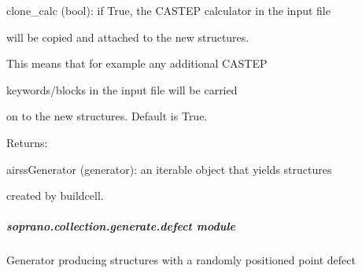 \documentclass[letterpaper,10pt,english]{sphinxmanual}
\begin{document}
\begin{fulllineitems}
\begin{DUlineblock}{0em}
\begin{DUlineblock}{\DUlineblockindent}
\item[] clone\_calc (bool): if True, the CASTEP calculator in the input file
\item[]
\begin{DUlineblock}{\DUlineblockindent}
\item[] will be copied and attached to the new structures.
\item[] This means that for example any additional CASTEP
\item[] keywords/blocks in the input file will be carried
\item[] on to the new structures. Default is True.
\end{DUlineblock}
\end{DUlineblock}
\end{DUlineblock}

\begin{DUlineblock}{0em}
\item[] Returns:
\item[]
\begin{DUlineblock}{\DUlineblockindent}
\item[] airssGenerator (generator): an iterable object that yields structures
\item[]
\begin{DUlineblock}{\DUlineblockindent}
\item[] created by buildcell.
\end{DUlineblock}
\end{DUlineblock}
\end{DUlineblock}

\end{fulllineitems}



\subparagraph{soprano.collection.generate.defect module}
\label{doctree/soprano.collection.generate.defect:module-soprano.collection.generate.defect}\label{doctree/soprano.collection.generate.defect::doc}\label{doctree/soprano.collection.generate.defect:soprano-collection-generate-defect-module}
Generator producing structures with a randomly positioned point defect
\end{document}
